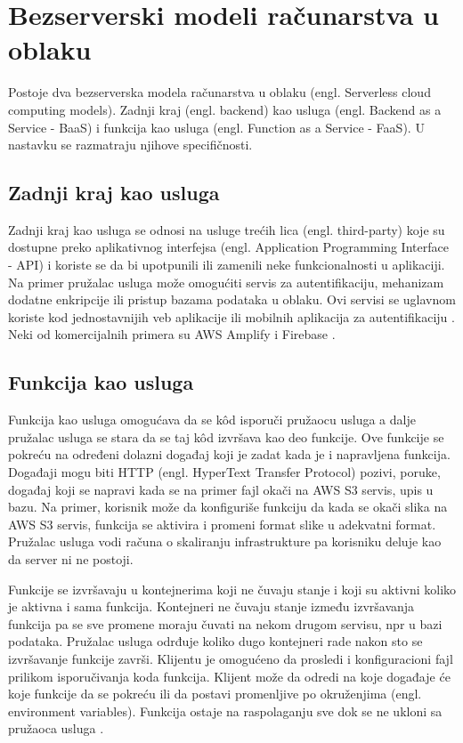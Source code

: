 \documentclass[12pt,oneside]{memoir}
\begin{document}
\section{Bezserverski modeli računarstva u oblaku}
Postoje dva bezserverska modela računarstva u oblaku (engl. Serverless cloud computing models). Zadnji kraj (engl. backend) kao usluga (engl. Backend as a Service - BaaS) i funkcija kao usluga (engl. Function as a Service - FaaS). U nastavku se razmatraju njihove specifičnosti.

\subsection{Zadnji kraj kao usluga}

Zadnji kraj kao usluga se odnosi na usluge trećih lica (engl. third-party) koje su dostupne preko aplikativnog interfejsa (engl. Application Programming Interface - API) i koriste se da bi upotpunili ili zamenili neke funkcionalnosti u aplikaciji. Na primer pružalac usluga može omogućiti servis za autentifikaciju, mehanizam dodatne enkripcije ili pristup bazama podataka u oblaku. Ovi servisi se uglavnom koriste kod jednostavnijih veb aplikacije ili mobilnih aplikacija za autentifikaciju \cite{wis, bsa}. Neki od komercijalnih primera su AWS Amplify i Firebase \cite{baasp}.

\subsection{Funkcija kao usluga}
Funkcija kao usluga omogućava da se kôd isporuči pružaocu usluga a dalje pružalac usluga se stara da se taj kôd izvršava kao deo funkcije. Ove funkcije se pokreću na određeni dolazni događaj koji je zadat kada je i napravljena funkcija. Događaji mogu biti HTTP (engl. HyperText Transfer Protocol) pozivi, poruke, događaj koji se napravi kada se na primer fajl okači na AWS S3 servis, upis u bazu. Na primer, korisnik može da konfiguriše funkciju da kada se okači slika na AWS S3 servis, funkcija se aktivira i promeni format slike u adekvatni format. Pružalac usluga vodi računa o skaliranju infrastrukture pa korisniku deluje kao da server ni ne postoji. 

Funkcije se izvršavaju u kontejnerima koji ne čuvaju stanje i koji su aktivni koliko je aktivna i sama funkcija. Kontejneri ne čuvaju stanje između izvršavanja funkcija pa se sve promene moraju čuvati na nekom drugom servisu, npr u bazi podataka. Pružalac usluga odrđuje koliko dugo kontejneri rade nakon sto se izvršavanje funkcije završi. Klijentu je omogućeno da prosledi i konfiguracioni fajl prilikom isporučivanja koda funkcija. Klijent može da odredi na koje događaje će koje funkcije da se pokreću ili da postavi promenljive po okruženjima (engl. environment variables). Funkcija ostaje na raspolaganju sve dok se ne ukloni sa pružaoca usluga \cite{bsa}.
\end{document}

